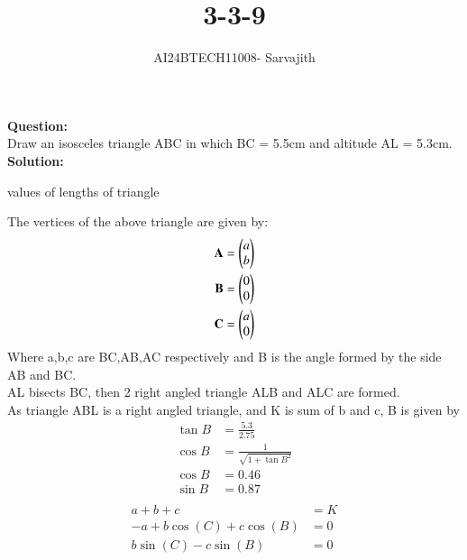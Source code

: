 \documentclass[journal]{IEEEtran}
\begin{document}

\vspace{3cm}

\title{3-3-9}
\author{AI24BTECH11008- Sarvajith
}
{\let\newpage\relax\maketitle}

\renewcommand{\thefigure}{\theenumi}
\renewcommand{\thetable}{\theenumi}
\setlength{\intextsep}{10pt} %
\renewcommand{\thetable}{\theenumi}
\textbf{Question: }\\
Draw an isosceles triangle ABC in which BC = 5.5cm and altitude AL = 5.3cm. \\
\textbf{Solution: }\\
\renewcommand{\tablename}{TABLE 1}
\begin{table}[h!]    
\centering
 
\caption{values of lengths of triangle}
 \label{tab1-1.2-18-1}
\end{table}
The vertices of the above triangle are given by:
\begin{align}
    \textbf{A} &= \begin{pmatrix}a\\b\end{pmatrix} \label{eq. 3-3-9.1}\\
    \textbf{B} &= \begin{pmatrix}0\\0\end{pmatrix}\label{eq. 3-3-9.2}\\
    \textbf{C} &= \begin{pmatrix}a\\0\end{pmatrix}\label{eq. 3-3-9.3}
\end{align}
Where a,b,c are BC,AB,AC respectively and B is the angle formed by the side AB and BC.\\
AL bisects BC, then 2 right angled triangle ALB and ALC are formed.\\
As triangle ABL is a right angled triangle, and K is sum of b and c, B is given by 
\begin{align*}
    \tan B &= \frac{5.3}{2.75}\\
    \cos B &= \frac{1}{\sqrt{1+\tan B^2}}\\
    \cos B &= 0.46\\\sin B &= 0.87\\
\end{align*}
\begin{align*}
	a+b+c&=K\\
	-a+b\cos(C)+c\cos(B)&=0\\
	b\sin(C)-c\sin(B)&=0\\
\end{align*}
\end{document}
